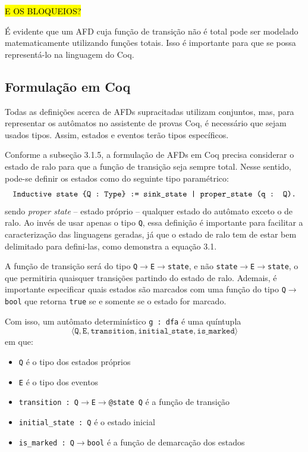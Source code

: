 \hl{E OS BLOQUEIOS?}

É evidente que um AFD cuja função de transição não é total pode ser modelado matematicamente utilizando funções totais. Isso é importante para que se possa representá-lo na linguagem do Coq.

\subsection{Formulação em Coq}

Todas as definições acerca de AFDs supracitadas utilizam conjuntos, mas, para representar os autômatos no assistente de provas Coq, é necessário que sejam usados tipos. Assim, estados e eventos terão tipos específicos.

Conforme a subseção 3.1.5, a formulação de AFDs em Coq precisa considerar o estado de ralo para que a função de transição seja sempre total. Nesse sentido, pode-se definir os estados como do seguinte tipo paramétrico: $$\text{\texttt{Inductive state \{Q : Type\} := sink\_state | proper\_state (q : Q).}}$$ sendo \textit{proper state} -- estado próprio -- qualquer estado do autômato exceto o de ralo. Ao invés de usar apenas o tipo \texttt{Q}, essa definição é importante para facilitar a caracterização das linguagens geradas, já que o estado de ralo tem de estar bem delimitado para defini-las, como demonstra a equação 3.1.

A função de transição será do tipo \texttt{Q$\rightarrow$E$\rightarrow$state}, e não \texttt{state$\rightarrow$E$\rightarrow$state}, o que permitiria quaisquer transições partindo do estado de ralo. Ademais, é importante especificar quais estados são marcados com uma função do tipo \texttt{Q$\rightarrow$bool} que retorna \texttt{true} se e somente se o estado for marcado.

Com isso, um autômato determinístico \texttt{g : dfa} é uma quíntupla $$\langle\texttt{Q}, \texttt{E}, \texttt{transition}, \texttt{initial\_state}, \texttt{is\_marked}\rangle$$ em que: \begin{itemize}[label={}]
	\item \texttt{Q} é o tipo dos estados próprios
	\item \texttt{E} é o tipo dos eventos
	\item  \texttt{transition : Q$\rightarrow$E$\rightarrow$@state Q} é a função de transição
	\item \texttt{initial\_state : Q} é o estado inicial
	\item \texttt{is\_marked : Q$\rightarrow$bool} é a função de demarcação dos estados
\end{itemize}


